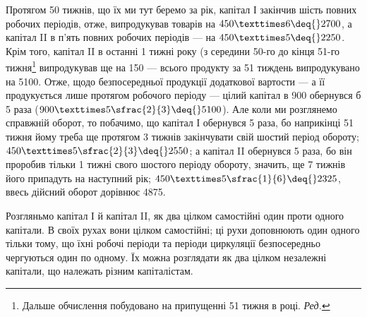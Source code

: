 \noindent{}Протягом
50 тижнів, що їх ми тут беремо за рік, капітал І закінчив
шість повних робочих періодів, отже, випродукував товарів на $450 × 6
\deq{} 2700$, а капітал II в п’ять повних робочих періодів — на
$450 × 5 \deq{} 2250$. Крім того, капітал II в останні 1 тижні року
(з середини 50-го до кінця 51-го тижня\footnote*{
Дальше обчислення побудовано на припущенні 51 тижня в році. \emph{Ред.}
} випродукував ще на 150 — всього продукту за 51 тиждень випродукувано на 5100.
Отже, щодо безпосередньої продукції додаткової вартости — а її продукується
лише протягом робочого періоду — цілий капітал в 900 обернувся
б 5 раза ($900 × 5\sfrac{2}{3} \deq{} 5100$). Але коли ми розглянемо
справжній оборот, то побачимо, що капітал І обернувся 5 раза, бо
наприкінці 51 тижня йому треба ще протягом 3 тижнів закінчувати
свій шостий період обороту; $450 × 5\sfrac{2}{3} \deq{} 2550$; а капітал
II обернувся 5 раза, бо він проробив тільки 1 тижні свого
шостого періоду обороту, значить, ще 7 тижнів його припадуть на
наступний рік; $450 × 5\sfrac{1}{6} \deq{} 2325$, ввесь дійсний оборот дорівнює
4875.

Розгляньмо капітал І й капітал II, як два цілком самостійні один проти
одного капітали. В своїх рухах вони цілком самостійні; ці рухи доповнюють
один одного тільки тому, що їхні робочі періоди та періоди
циркуляції безпосередньо чергуються один по одному. Їх можна розглядати
як два цілком незалежні капітали, що належать різним капіталістам.

